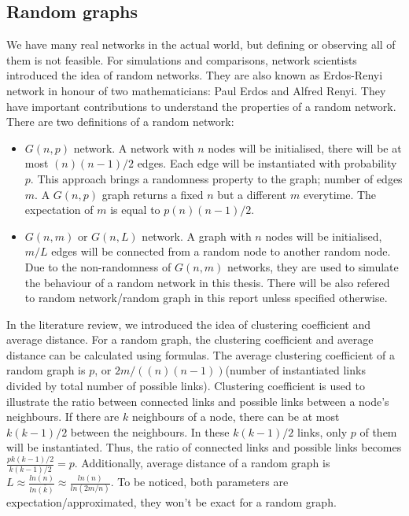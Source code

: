 \documentclass[12pt]{article}
\begin{document}
\subsection{Random graphs}
We have many real networks in the actual world, but defining or observing all of them is not feasible. For simulations and comparisons, network scientists introduced the idea of random networks. They are also known as Erdos-Renyi network in honour of two mathematicians: Paul Erdos and Alfred Renyi. They have important contributions to understand the properties of a random network\cite{barabási2016network}.\\
\noindent
There are two definitions of a random network:
\begin{itemize}
    \item $G(n,p)$ network. A network with $n$ nodes will be initialised, there will be at most $(n)(n-1)/2$ edges. Each edge will be instantiated with probability $p$. This approach brings a randomness property to the graph; number of edges $m$. A $G(n,p)$ graph returns a fixed $n$ but a different $m$ everytime. The expectation of $m$ is equal to $p(n)(n-1)/2$.
    \item $G(n,m)$ or $G(n,L)$ network. A graph with $n$ nodes will be initialised, $m/L$ edges will be connected from a random node to another random node. Due to the non-randomness of $G(n,m)$ networks, they are used to simulate the behaviour of a random network in this thesis. There will be also refered to random network/random graph in this report unless specified otherwise.
\end{itemize}

\noindent
In the literature review, we introduced the idea of clustering coefficient and average distance. For a random graph, the clustering coefficient and average distance can be calculated using formulas.\cite{barabási2016network} The average clustering coefficient of a random graph is $p$, or $2m/((n)(n-1))$(number of instantiated links divided by total number of possible links). Clustering coefficient is used to illustrate the ratio between connected links and possible links between a node's neighbours. If there are $k$ neighbours of a node, there can be at most $k(k-1)/2$ between the neighbours. In these $k(k-1)/2$ links, only $p$ of them will be instantiated. Thus, the ratio of connected links and possible links becomes $\frac{pk(k-1)/2}{k(k-1)/2}=p$. Additionally, average distance of a random graph is $L \approx \frac{ln(n)}{ln\bar{(k)}}\approx \frac{ln(n)}{ln(2m/n)}$. To be noticed, both parameters are expectation/approximated, they won't be exact for a random graph.
\end{document}
